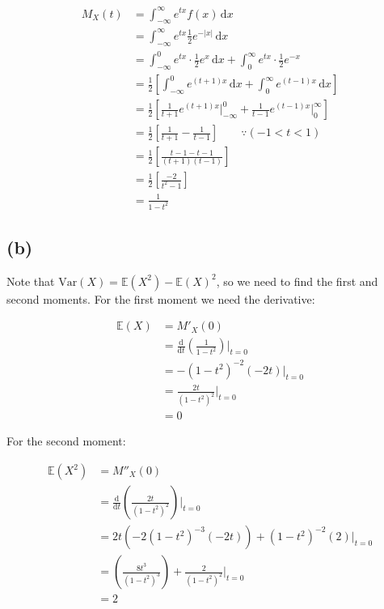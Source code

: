 \documentclass[12pt]{article}
\begin{document}
\begin{align*}
    M_X (t) &= \int_{-\infty}^{\infty} e^{tx}f(x) \, \mathrm{d}x \\ 
    &= \int_{-\infty}^{\infty} e^{tx}\frac{1}{2}e^{-|x|} \, \mathrm{d}x \\ 
    &= \int_{-\infty}^{0} e^{tx} \cdot \frac{1}{2} e^{x} \, \mathrm{d}x + \int_{0}^{\infty} e^{tx} \cdot \frac{1}{2} e^{-x} \\
    &= \frac{1}{2}\left[ \int_{-\infty}^{0} e^{(t+1)x} \, \mathrm{d} x+ \int_{0}^{\infty} e^{(t-1)x} \, \mathrm{d} x\right] \\ 
    &= \frac{1}{2} \left[ \frac{1}{t+1} e^{(t+1)x} \Biggr|_{-\infty}^{0} + \frac{1}{t-1} e^{(t-1)x} \Biggr|_{0}^{\infty}\right] \\ 
    &= \frac{1}{2}\left[\frac{1}{t+1} - \frac{1}{t-1}\right] \qquad \because (-1 < t < 1) \\
    &= \frac{1}{2} \left[ \frac{t-1-t-1}{(t+1)(t-1)}\right] \\ 
    &= \frac{1}{2} \left[ \frac{-2}{t^{2} - 1}\right] \\ 
    &= \boxed{\frac{1}{1-t^{2}}}
\end{align*}

\subsection*{(b)}

Note that $\text{Var}(X) = \mathbb{E}(X^{2}) - \mathbb{E}(X)^{2}$, so we need to find the first and second moments. For the first moment we need the derivative: 

\begin{align*}
    \mathbb{E}(X) &= M'_X (0) \\ 
    &= \frac{\text{d}}{\text{d}t}\left( \frac{1}{1 - t^{2}}\right) \Biggr|_{t=0} \\ 
    &= -(1-t^{2})^{-2}(-2t) \Bigr|_{t=0} \\ 
    &= \frac{2t}{(1-t^{2})^{2}} \Biggr|_{t=0} \\ 
    &= 0
\end{align*}

\noindent For the second moment: 

\begin{align*}
    \mathbb{E}(X^{2}) &= M''_X (0) \\ 
    &= \frac{\text{d}}{\text{d}t}\left(\frac{2t}{(1-t^{2})^{2}}\right) \Biggr|_{t=0} \\ 
    &= 2t(-2(1-t^{2})^{-3} (-2t)) + (1-t^{2})^{-2}(2) \Bigr|_{t=0} \\ 
    &= \left(\frac{8t^{3}}{(1-t^{2})^{3}}\right) + \frac{2}{(1-t^{2})^{2}} \Biggr|_{t=0} \\ 
    &= 2
\end{align*}
\end{document}

